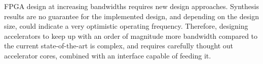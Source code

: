 FPGA design at increasing bandwidths requires new design approaches. Synthesis results are no guarantee for the implemented design, and depending on the design size, could indicate a very optimistic operating frequency. Therefore, designing accelerators to keep up with an order of magnitude more bandwidth compared to the current state-of-the-art is complex, and requires carefully thought out accelerator cores, combined with an interface capable of feeding it.









